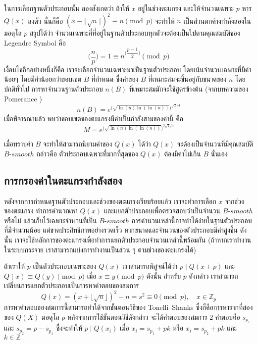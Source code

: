 \documentclass[20pt,a4paper]{article}
\begin{document}
\vspace{4mm}

ในการเลือกฐานตัวประกอบนั้น ลองสังเกตว่า ถ้าให้ $x$ อยู่ในช่วงตะแกรง และให้จำนวนเฉพาะ $p$ หาร $Q(x)$ ลงตัว นั่นก็คือ $(x-\lfloor\sqrt{n}\rfloor)^2 \equiv n \pmod{p}$
จะทำให้ $n$ เป็นส่วนตกค้างกำลังสองในมอดุโล $p$ สรุปได้ว่า จำนวนเฉพาะคี่ที่อยู่ในฐานตัวประกอบทุกตัวจะต้องเป็นไปตามคุณสมบัติของ Legendre Symbol คือ
\begin{equation}
    \Big(\frac{n}{p}\Big) = 1 \equiv n^{\big(\dfrac{p-1}{2}\big)} \pmod{p}
\end{equation}
เงื่อนไขอีกอย่างหนึ่งก็คือ เราจะเลือกจำนวนเฉพาะมาเป็นฐานตัวประกอบ โดยเน้นจำนวนเฉพาะที่มีค่าน้อยๆ โดยมีค่าน้อยกว่าขอบเขต $B$ ที่กำหนด ซึ่งค่าของ $B$ ที่เหมาะสมจะขึ้นอยู่กับขนาดของ $n$ โดยปกติทั่วไป การหาจำนวนฐานตัวประกอบ $n(B)$ ที่เหมาะสมมักจะใช้สูตรข้างต้น (จากบทความของ Pomerance \cite{canfield_erdös_pomerance_1983})
\begin{equation}
    n(B) = e^{\big(\sqrt{\ln(n)\ln(\ln(n))}\big)^{\sqrt{2}/4}}
\end{equation}
เมื่อพิจารณาแล้ว พบว่าขอบเขตของตะแกรงมีค่าเป็นกำลังสามของค่านี้ คือ
\begin{equation}
    M = e^{\big(\sqrt{\ln(n)\ln(\ln(n))}\big)^{3\sqrt{2}/4}}
\end{equation} 

เมื่อทราบค่า $B$ จะทำให้สามารถนิยามค่าของ $Q(x)$ ได้ว่า $Q(x)$ จะต้องเป็นจำนวนที่มีคุณสมบัติ $B$-$smooth$ กล่าวคือ ตัวประกอบเฉพาะที่มากที่สุดของ $Q(x)$ ต้องมีค่าไม่เกิน $B$ นั่นเอง

\subsection{การกรองค่าในตะแกรงกำลังสอง}
หลังจากการกำหนดฐานตัวประกอบและช่วงของตะแกรงเรียบร้อยแล้ว เราจะทำการเลือก $x$ จากช่วงของตะแกรง ทำการคำนวณหา $Q(x)$ และแยกตัวประกอบเพื่อตรวจสอบว่าเป็นจำนวน $B$-$smooth$ หรือไม่ แล้วเก็บไว้เฉพาะจำนวนที่เป็น $B$-$smooth$
การคำนวนเหล่านี้อาจทำได้ง่ายในฐานตัวประกอบที่มีจำนวนน้อย แต่ขาดประสิทธิภาพอย่างรวดเร็ว หากขนาดและจำนวนของตัวประกอบมีค่าสูงขึ้น
ดังนั้น เราจะใช้หลักการของตะแกรงเพื่อทำการแยกตัวประกอบจำนวนเหล่านี้พร้อมกัน (ถ้าหากเราทำงานในระบบกระจาย เราสามารถแบ่งการทำงานเป็นส่วน ๆ ตามช่วงของตะแกรงได้)

\vspace{4mm}

ถ้าเราให้ $p$ เป็นตัวประกอบเฉพาะของ $Q(x)$ เราสามารถพิสูจน์ได้ว่า $p \mid Q(x+p)$ และ $Q(x) \equiv Q(y) \pmod{p}$ เมื่อ $x \equiv y \pmod{p}$
ดังนั้น สำหรับ $p$ ดังกล่าว เราสามารถเปลี่ยนการแยกตัวประกอบเป็นการหาคำตอบของสมการ
\begin{equation}
    Q(x) = (x+\lfloor\sqrt{n}\rfloor)^2 - n = s^2 \equiv 0 \pmod{p}, \quad x \in \mathbb{Z}_p
\end{equation}
การหาคำตอบของสมการนี้สามารถทำได้จากขั้นตอนวิธีของ Tonelli--Shanks ซึ่งก็คือการหารากที่สองของ $Q(X)$ มอดุโล $p$ หลังจากการใช้ขั้นตอนวิธีดังกล่าว
จะได้คำตอบของสมการ $2$ คำตอบคือ $s_{p_1}$ และ $s_{p_2} = p - s_{p_1}$ ซึ่งจะทำให้ $p \mid Q(x_i)$ เมื่อ $x_i = s_{p_1} + pk$ หรือ $x_i = s_{p_2} + pk$ และ $k \in \mathbb{Z}$
\end{document}
